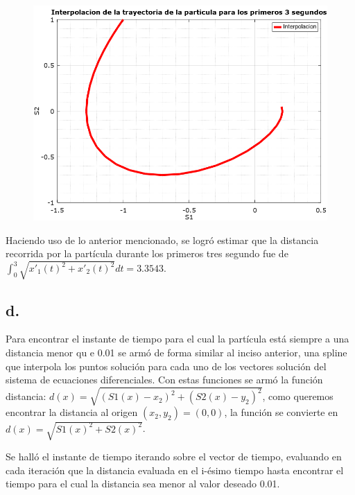 \documentclass[11pt]{article}
\begin{document}
\begin{figure}[h]
	\centering
	\includegraphics{interpolacion.png}
\end{figure}

Haciendo uso de lo anterior mencionado, se logró estimar que la distancia recorrida por la partícula durante los primeros tres segundo fue de $\int_0^3\sqrt{x'_1(t)^2+x'_2(t)^2}dt=3.3543$.

\subsection*{d.}
Para encontrar el instante de tiempo para el cual la partícula está siempre a una distancia menor qu e 0.01 se armó de forma similar al inciso anterior, una spline que interpola los puntos solución para cada uno de los vectores solución del sistema de ecuaciones diferenciales. Con estas funciones se armó la función distancia: $d(x)=\sqrt{(S1(x)-x_2)^2+(S2(x)-y_2)^2}$, como queremos encontrar la distancia al origen $(x_2,y_2)=(0,0)$, la función se convierte en $d(x)=\sqrt{S1(x)^2+S2(x)^2}$.

Se halló el instante de tiempo iterando sobre el vector de tiempo, evaluando en cada iteración que la distancia evaluada en el i-ésimo tiempo hasta encontrar el tiempo para el cual la distancia sea menor al valor deseado 0.01.
\end{document}
